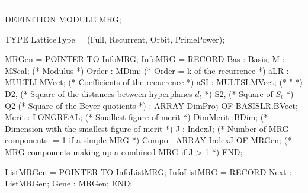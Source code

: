 
\bigskip\hrule
\code

DEFINITION MODULE MRG;

TYPE
   LatticeType = (Full, Recurrent, Orbit, PrimePower);

   MRGen =  POINTER TO InfoMRG;
   InfoMRG = RECORD
      Bas   : Basis;
      M     : MScal;                    (* Modulus *)
      Order : MDim;                     (* Order = k of the recurrence *)
      aLR   : MULTLI.MVect;             (* Coefficients of the recurrence *)
      aSI   : MULTSI.MVect;             (*               "                *)
      D2,                               (* Square of the distances
                                             between hyperplanes $d_t$ *)
      S2,                               (* Square of $S_t$ *)
      Q2                                (* Square of the Beyer quotients *)
         : ARRAY DimProj OF BASISLR.BVect;
      Merit : LONGREAL;                 (* Smallest figure of merit *)
      DimMerit :BDim;                   (* Dimension with the smallest 
                                           figure of merit *)
      J     : IndexJ;                   (* Number of MRG components.
                                           = 1 if a simple MRG *)      
      Compo : ARRAY IndexJ OF MRGen; (* MRG components
                       making up a combined MRG if J > 1 *)
      END;

   ListMRGen = POINTER TO InfoListMRG;
   InfoListMRG = RECORD
      Next : ListMRGen;
      Gene : MRGen;
      END;

\endcode

